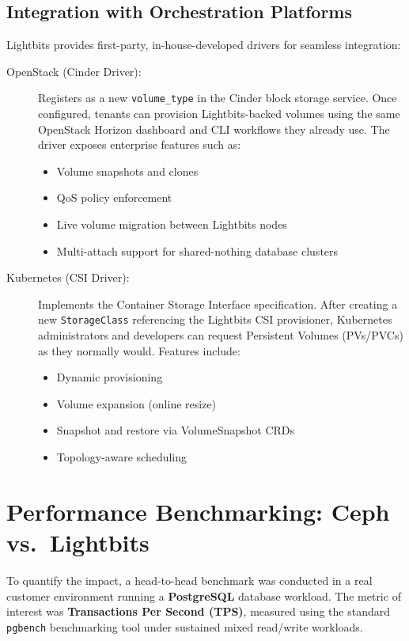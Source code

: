 \documentclass[12pt,a4paper,oneside]{report}
\begin{document}
\subsection{Integration with Orchestration Platforms}

Lightbits provides first-party, in-house-developed drivers for seamless integration:

\begin{description}
    \item[OpenStack (Cinder Driver):] Registers as a new \texttt{volume\_type} in the Cinder block storage service. Once configured, tenants can provision Lightbits-backed volumes using the same OpenStack Horizon dashboard and CLI workflows they already use. The driver exposes enterprise features such as:
    \begin{itemize}
        \item Volume snapshots and clones
        \item QoS policy enforcement
        \item Live volume migration between Lightbits nodes
        \item Multi-attach support for shared-nothing database clusters
    \end{itemize}

    \item[Kubernetes (CSI Driver):] Implements the Container Storage Interface specification. After creating a new \texttt{StorageClass} referencing the Lightbits CSI provisioner, Kubernetes administrators and developers can request Persistent Volumes (PVs/PVCs) as they normally would. Features include:
    \begin{itemize}
        \item Dynamic provisioning
        \item Volume expansion (online resize)
        \item Snapshot and restore via VolumeSnapshot CRDs
        \item Topology-aware scheduling
    \end{itemize}
\end{description}

\section{Performance Benchmarking: Ceph vs.\ Lightbits}

To quantify the impact, a head-to-head benchmark was conducted in a real customer environment running a \textbf{PostgreSQL} database workload. The metric of interest was \textbf{Transactions Per Second (TPS)}, measured using the standard \texttt{pgbench} benchmarking tool under sustained mixed read/write workloads.
\end{document}
